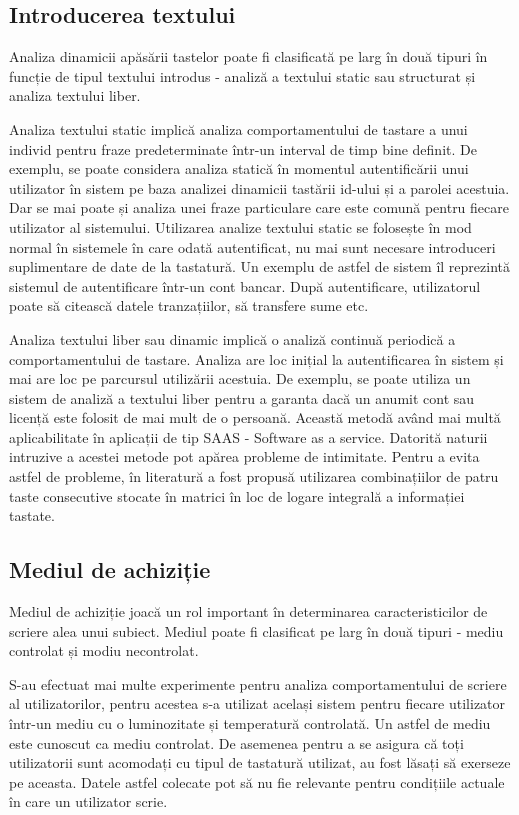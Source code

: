 \documentclass[9pt,shortpaper,twoside,web]{ieeecolor}
\begin{document}
	
\subsection{Introducerea textului}
	Analiza dinamicii apăsării tastelor poate fi clasificată pe larg în două tipuri în funcție de tipul textului introdus - analiză a textului static sau structurat și analiza textului liber. 
	
	Analiza textului static implică analiza comportamentului de tastare a unui individ pentru fraze predeterminate într-un interval de timp bine definit. De exemplu, se poate considera analiza statică în momentul autentificării unui utilizator în sistem pe baza analizei dinamicii tastării id-ului și a parolei acestuia. Dar se mai  poate și analiza unei fraze particulare care este comună pentru fiecare utilizator al sistemului. Utilizarea analize textului static se folosește în mod normal în sistemele în care odată autentificat, nu mai sunt necesare introduceri suplimentare de date de la tastatură. Un exemplu de astfel de sistem îl reprezintă sistemul de autentificare într-un cont bancar. După autentificare, utilizatorul poate să citească datele tranzațiilor, să transfere sume etc.

	Analiza textului liber sau dinamic implică o analiză continuă periodică a comportamentului de tastare. Analiza are loc inițial la autentificarea în sistem și mai are loc pe parcursul utilizării acestuia. De exemplu, se poate utiliza un sistem de analiză a textului liber pentru a garanta dacă un anumit cont sau licență este folosit de mai mult de o persoană. Această metodă având mai multă aplicabilitate în aplicații de tip SAAS - Software as a service. Datorită naturii intruzive a acestei metode pot apărea probleme de intimitate. Pentru a evita astfel de probleme, în literatură a fost propusă utilizarea combinațiilor de patru taste consecutive stocate în matrici în loc de logare integrală a informației tastate.


\subsection{Mediul de achiziție}
	Mediul de achiziție joacă un rol important în determinarea caracteristicilor de scriere alea unui subiect. Mediul poate fi clasificat pe larg în două tipuri - mediu controlat și modiu necontrolat.

	S-au efectuat mai multe experimente pentru analiza comportamentului de scriere al utilizatorilor, pentru acestea s-a utilizat același sistem pentru fiecare utilizator într-un mediu cu o luminozitate și temperatură controlată. Un astfel de mediu este cunoscut ca mediu controlat. De asemenea pentru a se asigura că toți utilizatorii sunt acomodați cu tipul de tastatură utilizat, au fost lăsați să exerseze pe aceasta. Datele astfel colecate pot să nu fie relevante pentru condițiile actuale în care un utilizator scrie.
	
\end{document}
